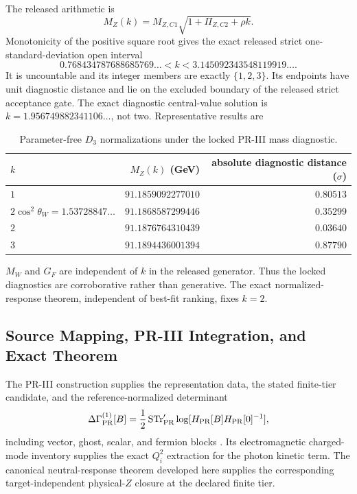 The released arithmetic is
\begin{equation}
 M_Z(k)=M_{Z,C1}\sqrt{1+\Pi_{Z,C2}+\rho k}.
 \label{eq:pr35-d3-mz-k}
\end{equation}
Monotonicity of the positive square root gives the exact released strict one-standard-deviation open interval
\begin{equation}
 0.768434787688685769\ldots< k <
 3.145092343548119919\ldots .
 \label{eq:pr35-d3-diagnostic-interval}
\end{equation}
It is uncountable and its integer members are exactly $\{1,2,3\}$.  Its endpoints have unit diagnostic distance and lie on the excluded boundary of the released strict acceptance gate.  The exact diagnostic central-value solution is $k=1.956749882341106\ldots$, not two.  Representative results are
\begin{table}[H]
\centering
\caption{Parameter-free $D_3$ normalizations under the locked PR-III mass diagnostic.}
\label{tab:pr35-d3-countermodel-diagnostics}
\begin{tabular}{@{}lrr@{}}
\toprule
$k$ & $M_Z(k)$ (GeV) & absolute diagnostic distance ($\sigma$)\\
\midrule
$1$ & $91.1859092277010$ & $0.80513$\\
$2\cos^2\theta_W=1.53728847\ldots$ & $91.1868587299446$ & $0.35299$\\
$2$ & $91.1876764310439$ & $0.03640$\\
$3$ & $91.1894436001394$ & $0.87790$\\
\bottomrule
\end{tabular}
\end{table}
$M_W$ and $G_F$ are independent of $k$ in the released generator.  Thus the locked diagnostics are corroborative rather than generative.  The exact normalized-response theorem, independent of best-fit ranking, fixes $k=2$.

\subsection{Source Mapping, PR-III Integration, and Exact Theorem}

The PR-III construction supplies the representation data, the stated finite-tier candidate, and the reference-normalized determinant
\begin{equation}
 \Delta\Gamma_{\rm PR}^{(1)}[B]
 =\frac12\operatorname{STr}_{\rm PR}'
 \log[H_{\rm PR}[B]H_{\rm PR}[0]^{-1}],
\end{equation}
including vector, ghost, scalar, and fermion blocks \cite{PRIII}.  Its electromagnetic charged-mode inventory supplies the exact $Q_i^2$ extraction for the photon kinetic term.  The canonical neutral-response theorem developed here supplies the corresponding target-independent physical-$Z$ closure at the declared finite tier.

